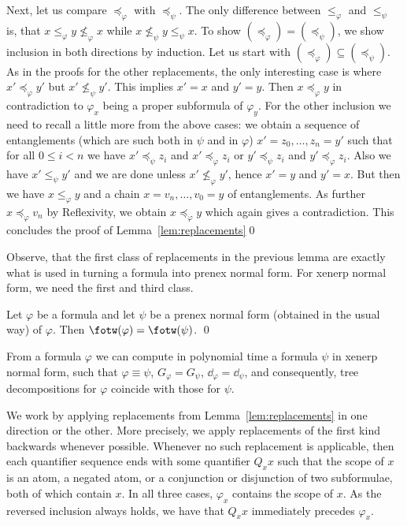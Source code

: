 \documentclass{LMCS}
\newcommand{\gfi}{G_{\varphi}}
\renewcommand{\phi}{\varphi}
\newcommand{\ad}{\dd_{\varphi}}
\newcommand{\refl}{Reflexivity}
\begin{document}
Next, let us compare $\preceq_{\phi}$ with $\preceq_{\psi}$. 
The only difference between $\leq_{\phi}$ and $\leq_{\psi}$ is, 
that $x\leq_{\phi}y\not\leq_{\phi}x$ while $x\not\leq_{\psi}y\leq_{\psi}x$. 
To show $(\preceq_{\phi})=(\preceq_{\psi})$, 
we show inclusion in both directions by induction. 
Let us start with $(\preceq_{\phi})\subseteq(\preceq_{\psi})$. 
As in the proofs for the other replacements, 
the only interesting case is 
where $x'\preceq_{\phi}y'$ but $x'\not\leq_{\psi}y'$. 
This implies $x'=x$ and $y'=y$. 
Then $x\preceq_{\phi}y$ 
in contradiction to $\phi_x$ being a proper subformula of $\phi_y$. 
For the other inclusion we need to recall a little more 
from the above cases: 
we obtain a sequence of entanglements 
(which are such both in $\psi$ and in $\phi$) 
$x'=z_0,\ldots,z_n=y'$ such that for all $0\leq i<n$ 
we have $x'\preceq_{\psi}z_i$ and $x'\preceq_{\phi}z_i$ 
or $y'\preceq_{\psi}z_i$ and $y'\preceq_{\phi}z_i$. 
Also we have $x'\leq_{\psi}y'$ and we are done unless $x'\not\leq_{\phi}y'$, 
hence $x'=y$ and $y'=x$. 
But then we have $x\leq_{\phi}y$ and a chain 
$x=v_n,\ldots,v_0=y$ of entanglements. 
As further $x\preceq_{\phi}v_n$ by \refl, 
we obtain $x\preceq_{\phi}y$ which again gives a contradiction.
This concludes the proof of Lemma~\ref{lem:replacements}\qed

Observe, that the first class of replacements in the previous lemma 
are exactly what is used in turning a formula into prenex normal form. 
For xenerp normal form, we need the first and third class. 

\begin{cor}\label{lem:prenex}
Let $\phi$ be a formula 
and let $\psi$ be a prenex normal form (obtained in the usual way) of $\phi$. 
Then $\fotw(\phi)=\fotw(\psi)$. 
\qed\end{cor}

\begin{lem}\label{lem:xenerp}
	{}From a formula $\phi$ we can compute in polynomial time 
a formula $\psi$ in xenerp normal form, 
such that $\phi\equiv\psi$, $\gfi=G_{\psi}$, $\ad=\dd_{\psi}$, 
and consequently, tree decompositions for $\phi$ 
coincide with those for $\psi$. 
\end{lem}

\proof
We work by applying replacements from Lemma~\ref{lem:replacements} 
in one direction or the other. 
More precisely, 
we apply replacements of the first kind backwards whenever possible. 
When\-ever no such replacement is applicable, 
then each quantifier sequence ends with some quantifier $Q_xx$ 
such that the scope of $x$ is an atom, a negated atom, 
or a conjunction or disjunction of two subformulae, 
both of which contain $x$. 
In all three cases, $\phi_x$ contains the scope of $x$. 
As the reversed inclusion always holds, 
we have that $Q_xx$ immediately precedes $\phi_x$. 
\end{document}

